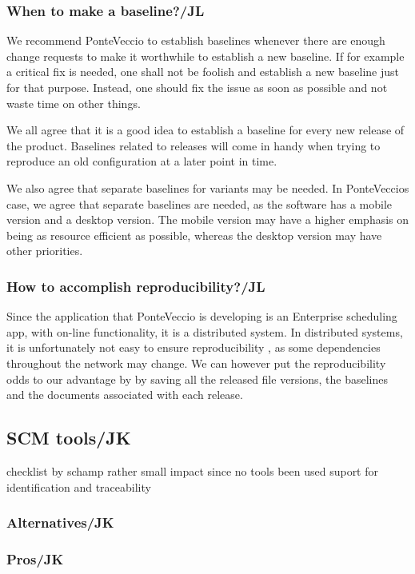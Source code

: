 \documentclass[10pt]{article}
\begin{document}
\subsubsection{When to make a baseline?/JL}
We recommend PonteVeccio to establish baselines whenever there are enough change requests to make it worthwhile to establish a new baseline. If for example a critical fix is needed, one shall not be foolish and establish a new baseline just for that purpose. Instead, one should fix the issue as soon as possible and not waste time on other things.

\noindent We all agree that it is a good idea to establish a baseline for every new release of the product. Baselines related to releases will come in handy when trying to reproduce an old configuration at a later point in time.

\noindent We also agree that separate baselines for variants may be needed. In PonteVeccios case, we agree that separate baselines are needed, as the software has a mobile version and a desktop version. The mobile version may have a higher emphasis on being as resource efficient as possible, whereas the desktop version may have other priorities.

\subsubsection{How to accomplish reproducibility?/JL}
\noindent Since the application that PonteVeccio is developing is an Enterprise scheduling app, with on-line functionality, it is a distributed system. In distributed systems, it is unfortunately not easy to ensure reproducibility \cite{Bays}, as some dependencies throughout the network may change. We can however put the reproducibility odds to our advantage by by saving all the released file versions, the baselines and the documents associated with each release. 

\subsection{SCM tools/JK}
checklist by schamp
rather small impact since no tools been used
suport for identification and traceability

\subsubsection{Alternatives/JK}
\subsubsection{Pros/JK}
\end{document}

